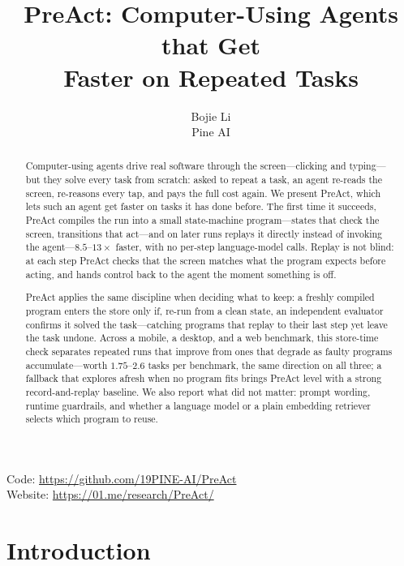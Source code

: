 \documentclass[11pt]{article}
\title{PreAct: Computer-Using Agents that Get\\Faster on Repeated Tasks}
\author{
  Bojie Li \\
  Pine AI
}
\date{}
\begin{document}
\maketitle

\begin{abstract}
Computer-using agents drive real software through the screen---clicking and typing---but they solve every task from scratch: asked to repeat a task, an agent re-reads the screen, re-reasons every tap, and pays the full cost again. We present PreAct, which lets such an agent get faster on tasks it has done before. The first time it succeeds, PreAct compiles the run into a small state-machine program---states that check the screen, transitions that act---and on later runs replays it directly instead of invoking the agent---$8.5$--$13\times$ faster, with no per-step language-model calls. Replay is not blind: at each step PreAct checks that the screen matches what the program expects before acting, and hands control back to the agent the moment something is off.

PreAct applies the same discipline when deciding what to keep: a freshly compiled program enters the store only if, re-run from a clean state, an independent evaluator confirms it solved the task---catching programs that replay to their last step yet leave the task undone. Across a mobile, a desktop, and a web benchmark, this store-time check separates repeated runs that improve from ones that degrade as faulty programs accumulate---worth $1.75$--$2.6$ tasks per benchmark, the same direction on all three; a fallback that explores afresh when no program fits brings PreAct level with a strong record-and-replay baseline. We also report what did not matter: prompt wording, runtime guardrails, and whether a language model or a plain embedding retriever selects which program to reuse.
\end{abstract}

\begin{center}
\small
Code: \url{https://github.com/19PINE-AI/PreAct} \\[2pt]
Website: \url{https://01.me/research/PreAct/}
\end{center}
\vspace{-0.6em}

\section{Introduction}
\label{sec:intro}
\end{document}
